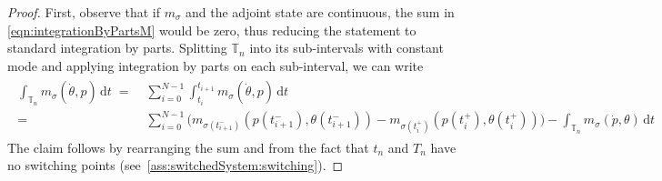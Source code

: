 \documentclass[10pt,a4paper]{amsart}
\newcommand{\adState}{p}
\newcommand{\dt}{\,\mathrm{d}t}
\newcommand{\state}{\theta}
\newcommand{\switch}{\sigma}
\newcommand{\timeInt}{\mathbb{T}}
\begin{document}
\begin{proof}
   First, observe that if $m_{\switch}$ and the adjoint state are continuous, the sum in \eqref{eqn:integrationByPartsM} would be zero, thus reducing the statement to standard integration by parts. Splitting $\timeInt_n$ into its sub-intervals with constant mode and applying integration by parts on each sub-interval, we can write
    \begin{align*}
        \begin{aligned}
            \int_{\timeInt_n} m_{\switch}(\dot{\state},\adState)\dt\;=&\;\sum_{i=0}^{N-1}\int_{t_i}^{t_{i+1}} m_{\switch}(\dot{\state},\adState)\dt\\
            =&\;\sum_{i=0}^{N-1}\big( m_{\switch(t^-_{i+1})}(\adState(t^-_{i+1}),\state(t_{i+1}^-)) - m_{\switch(t^+_i)}(\adState(t^+_{i}),\state(t_{i}^+))\big)-\int_{\timeInt_n} m_{\switch}(\dot{\adState},\state)\dt
        \end{aligned}
    \end{align*}
   The claim follows by rearranging the sum and from the fact that $t_n$ and $T_n$ have no switching points (see \,\ref{ass:switchedSystem:switching}).
\end{proof}
\end{document}
